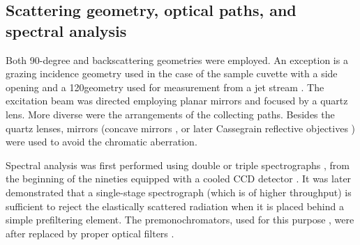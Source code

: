 \subsection{Scattering geometry, optical paths, and spectral analysis}

Both 90-degree and backscattering geometries were employed. An exception is a
grazing incidence geometry used in the case of the sample cuvette with a side
opening
\parencite{Jolles1984}
and a 120\textdegree geometry used for measurement from a jet stream
\parencite{Fodor1985}.
The excitation beam was directed employing planar mirrors and focused by a
quartz lens.
More diverse were the arrangements of the collecting paths.
Besides the quartz lenses, mirrors (concave mirrors
\cite{Blazej1977},
or later Cassegrain reflective objectives
\cite{%
	Toyama1991,%
	Russell1995%
})
were used to avoid the chromatic aberration.

Spectral analysis was first performed using double or triple spectrographs
\parencite{%
	Harada1975,%
	Gfrorer1993a,%
	Toyama1993%
},
from the beginning of the nineties equipped with a cooled CCD detector
\parencite{%
	Gfrorer1993a,%
	Toyama1993%
}.
It was later demonstrated that a single-stage spectrograph (which is of higher
throughput) is sufficient to reject the elastically scattered radiation when it
is placed behind a simple prefiltering element.
The premonochromators, used for this purpose
\parencite{%
	Hashimoto1993,%
	Russell1995%
},
were after replaced by proper optical filters
\parencite{%
	Munro1997,%
	Bykov2013%
}.
